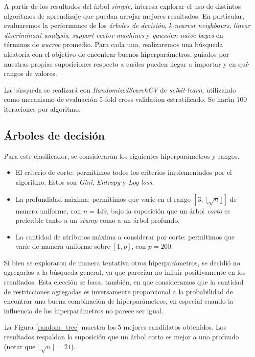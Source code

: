 A partir de los resultados del árbol \textit{simple}, interesa explorar el uso de distintos algoritmos de aprendizaje que puedan arrojar mejores resultados. En particular, evaluaremos la performance de los \textit{árboles de decisión}, \textit{k-nearest neighbours}, \textit{linear discriminant analysis}, \textit{support vector machines} y \textit{gaussian naïve bayes} en términos de \textit{aucroc} promedio. Para cada uno, realizaremos una búsqueda aleatoria con el objetivo de encontrar buenos hiperparámetros, guiados por nuestras propias suposiciones respecto a cuáles pueden llegar a importar y en qué rangos de valores.

La búsqueda se realizará con \textit{RandomizedSearchCV} de \textit{scikit-learn}, utilizando como mecanismo de evaluación $5$-fold cross validation estratificado. Se harán $100$ iteraciones por algoritmo.

\subsection{Árboles de decisión}
Para este clasificador, se considerarán los siguientes hiperparámetros y rangos. 

\begin{itemize}
    \item El criterio de corte: permitimos todos los criterios implementados por el algoritmo. Estos son \textit{Gini}, \textit{Entropy} y \textit{Log loss}. 
    \item La profundidad máxima: permitimos que varíe en el rango $[3,\ \lfloor\sqrt{n} \rfloor]$ de manera uniforme, con $n=449$, bajo la suposición que un árbol \textit{corto} es preferible tanto a un \textit{stump} como a un árbol profundo.
    \item La cantidad de atributos máxima a considerar por corte: permitimos que varíe de manera uniforme sobre $[1, p]$, con $p = 200$.
\end{itemize}

Si bien se exploraron de manera tentativa otros hiperparámetros, se decidió no agregarlos a la búsqueda general, ya que parecían no influir positivamente en los resultados. Esta elección se basa, también, en que consideramos que la cantidad de restricciones agregadas es inversamente proporcional a la probabilidad de encontrar una buena combinación de hiperparámetros, en especial cuando la influencia de los hiperparámetros no parece ser igual. 

La Figura \ref{random_tree} muestra los $5$ mejores candidatos obtenidos. Los resultados respaldan la suposición que un árbol corto es mejor a uno profundo (notar que $\lfloor\sqrt{n} \rfloor = 21$).

